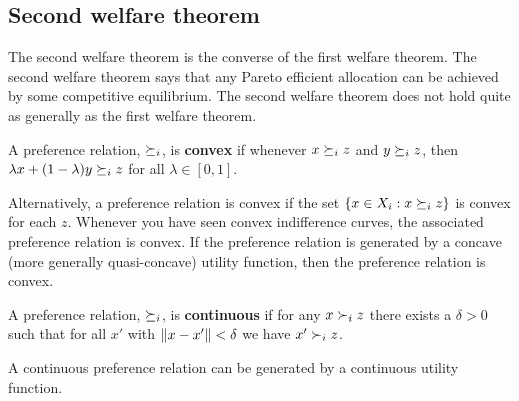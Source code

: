 \subsection{Second welfare theorem}
The second welfare theorem is the converse of the first welfare
theorem. The second welfare theorem says that any Pareto efficient
allocation can be achieved by some competitive equilibrium. The second
welfare theorem does not hold quite as generally as the first welfare
theorem. 
\begin{definition}
  A preference relation, $\succeq_i$, is \textbf{convex} if whenever $x
  \succeq_i z$ and $y \succeq_i z$, then $\lambda x + (1-\lambda) y
  \succeq_i z$ for all $\lambda \in [0,1]$. 
\end{definition}
Alternatively, a preference relation is convex if the set $\{x\in X_i: x
\succeq_i z\}$ is convex for each $z$. Whenever you have seen convex
indifference curves, the associated preference relation is convex. If
the preference relation is generated by a concave (more generally
quasi-concave) utility function, then the preference relation is
convex.
\begin{definition}
  A preference relation, $\succeq_i$, is \textbf{continuous} if
  for any  $x \succ_i z$ there exists a $\delta >
  0$ such that for all $x'$ with $\left\Vert {x - x'} \right\Vert<\delta$ we have $x'
  \succ_i z$.
\end{definition}
A continuous preference relation can be generated by a continuous
utility function.

